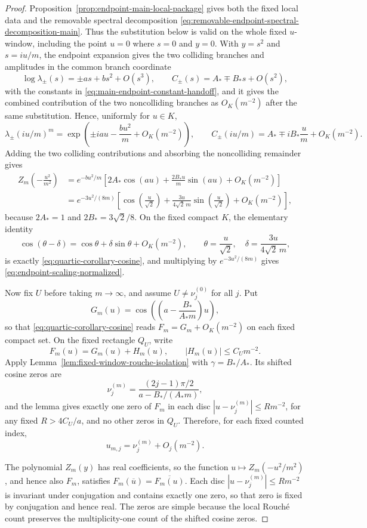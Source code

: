 \begin{proof}
Proposition~\ref{prop:endpoint-main-local-package} gives both the fixed local data and the removable spectral decomposition \eqref{eq:removable-endpoint-spectral-decomposition-main}.  Thus the substitution below is valid on the whole fixed $u$-window, including the point $u=0$ where $s=0$ and $y=0$.  With $y=s^2$ and $s=iu/m$, the endpoint expansion gives the two colliding branches and amplitudes in the common branch coordinate
\[
\log\lambda_\pm(s)=\pm as+bs^2+O(s^3),
\qquad
C_\pm(s)=A_*\mp B_*s+O(s^2),
\]
with the constants in \eqref{eq:main-endpoint-constant-handoff}, and it gives the combined contribution of the two noncolliding branches as $O_K(m^{-2})$ after the same substitution.  Hence, uniformly for $u\in K$,
\[
\lambda_\pm(iu/m)^m
=
\exp\!\left(\pm iau-\frac{bu^2}{m}+O_K(m^{-2})\right),
\qquad
C_\pm(iu/m)=A_*\mp iB_*\frac{u}{m}+O_K(m^{-2}).
\]
Adding the two colliding contributions and absorbing the noncolliding remainder gives
\begin{align*}
Z_m\!\left(-\frac{u^2}{m^2}\right)
&=
e^{-bu^2/m}
\left[
2A_*\cos(au)+\frac{2B_*u}{m}\sin(au)+O_K(m^{-2})
\right]  \\
&=
e^{-3u^2/(8m)}
\left[
\cos\!\left(\frac{u}{\sqrt2}\right)+\frac{3u}{4\sqrt2\,m}\sin\!\left(\frac{u}{\sqrt2}\right)+O_K(m^{-2})
\right],
\end{align*}
because $2A_*=1$ and $2B_*=3\sqrt2/8$.  On the fixed compact $K$, the elementary identity
\[
\cos(\theta-\delta)=\cos\theta+\delta\sin\theta+O_K(m^{-2}),
\qquad
\theta=\frac{u}{\sqrt2},
\quad
\delta=\frac{3u}{4\sqrt2\,m},
\]
is exactly \eqref{eq:quartic-corollary-cosine}, and multiplying by $e^{-3u^2/(8m)}$ gives \eqref{eq:endpoint-scaling-normalized}.

Now fix $U$ before taking $m\to\infty$, and assume $U\ne\nu_j^{(0)}$ for all $j$.  Put
\[
G_m(u)=\cos\!\left(\left(a-\frac{B_*}{A_*m}\right)u\right),
\]
so that \eqref{eq:quartic-corollary-cosine} reads \(F_m=G_m+O_K(m^{-2})\) on each fixed compact set.  On the fixed rectangle \(Q_U\), write
\[
F_m(u)=G_m(u)+H_m(u),
\qquad |H_m(u)|\le C_Um^{-2}.
\]
Apply Lemma~\ref{lem:fixed-window-rouche-isolation} with \(\gamma=B_*/A_*\).  Its shifted cosine zeros are
\[
\nu_j^{(m)}=\frac{(2j-1)\pi/2}{a-B_*/(A_*m)},
\]
and the lemma gives exactly one zero of \(F_m\) in each disc \(|u-\nu_j^{(m)}|\le Rm^{-2}\), for any fixed \(R>4C_U/a\), and no other zeros in \(Q_U\).  Therefore, for each fixed counted index,
\[
u_{m,j}=\nu_j^{(m)}+O_j(m^{-2}).
\]

The polynomial $Z_m(y)$ has real coefficients, so the function \(u\mapsto Z_m(-u^2/m^2)\), and hence also \(F_m\), satisfies \(F_m(\overline u)=\overline{F_m(u)}\).  Each disc \(|u-\nu_j^{(m)}|\le Rm^{-2}\) is invariant under conjugation and contains exactly one zero, so that zero is fixed by conjugation and hence real.  The zeros are simple because the local Rouch\'e count preserves the multiplicity-one count of the shifted cosine zeros.


\end{proof}
